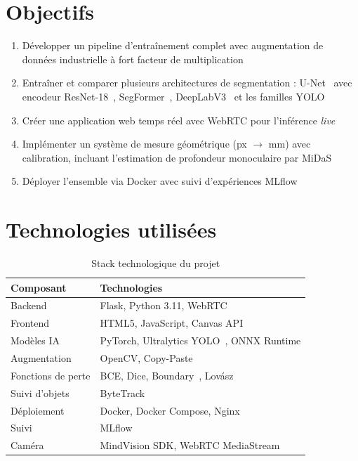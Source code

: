 \documentclass[12pt,a4paper]{report}
\begin{document}
\section{Objectifs}
\begin{enumerate}
    \item D\'evelopper un pipeline d'entra\^inement complet avec augmentation de donn\'ees industrielle \`a fort facteur de multiplication
    \item Entra\^iner et comparer plusieurs architectures de segmentation : U-Net~\cite{ronneberger2015unet} avec encodeur ResNet-18~\cite{he2016resnet}, SegFormer~\cite{xie2021segformer}, DeepLabV3~\cite{chen2017deeplabv3} et les familles YOLO~\cite{jocher2023yolov8}
    \item Cr\'eer une application web temps r\'eel avec WebRTC pour l'inf\'erence \textit{live}
    \item Impl\'ementer un syst\`eme de mesure g\'eom\'etrique (px $\rightarrow$ mm) avec calibration, incluant l'estimation de profondeur monoculaire par MiDaS~\cite{ranftl2020midas}
    \item D\'eployer l'ensemble via Docker avec suivi d'exp\'eriences MLflow
\end{enumerate}

\section{Technologies utilis\'ees}
\begin{table}[H]
\centering
\begin{tabular}{ll}
\toprule
\textbf{Composant} & \textbf{Technologies} \\
\midrule
Backend         & Flask, Python 3.11, WebRTC \\
Frontend        & HTML5, JavaScript, Canvas API \\
Mod\`eles IA      & PyTorch, Ultralytics YOLO~\cite{jocher2023yolov8}, ONNX Runtime \\
Augmentation    & OpenCV, Copy-Paste~\cite{ghiasi2021copypaste} \\
Fonctions de perte & BCE, Dice, Boundary~\cite{kervadec2019boundary}, Lov\'asz~\cite{berman2018lovasz} \\
Suivi d'objets  & ByteTrack~\cite{zhang2022bytetrack} \\
D\'eploiement     & Docker, Docker Compose, Nginx \\
Suivi           & MLflow \\
Cam\'era          & MindVision SDK, WebRTC MediaStream \\
\bottomrule
\end{tabular}
\caption{Stack technologique du projet}
\end{table}
\end{document}
